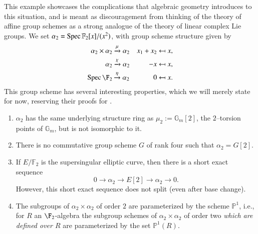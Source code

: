 \begin{example}\label{Alpha2Example}
This example showcases the complications that algebraic geometry introduces to this situation, and is meant as discouragement from thinking of the theory of affine group schemes as a strong analogue of the theory of linear complex Lie groups.  We set $\alpha_2 = \operatorname{Spec} \mathbb{F}_2[x]/(x^2)$, with group scheme structure given by
\begin{align*}
\alpha_2 \times \alpha_2 &\xrightarrow{\mu} \alpha_2 & x_1 + x_2 & \mapsfrom x, \\
\alpha_2 & \xrightarrow{\chi} \alpha_2 & -x & \mapsfrom x, \\
\Spec \F_2 & \xrightarrow{\eta} \alpha_2 & 0 & \mapsfrom x.
\end{align*}
This group scheme has several interesting properties, which we will merely state for now, reserving their proofs for .
\begin{enumerate}
\item $\alpha_2$ has the same underlying structure ring as $\mu_2 := \mathbb{G}_m[2]$, the $2$--torsion points of $\mathbb G_m$, but is not isomorphic to it.
\item There is no commutative group scheme $G$ of rank four such that $\alpha_2 = G[2]$.
\item If $E/\mathbb{F}_2$ is the supersingular elliptic curve, then there is a short exact sequence \[0 \rightarrow \alpha_2 \rightarrow E[2] \rightarrow \alpha_2 \rightarrow 0.\]  However, this short exact sequence does not split (even after base change).
\item The subgroups of $\alpha_2 \times \alpha_2$ of order $2$ are parameterized by the scheme $\mathbb{P}^1$, i.e., for $R$ an $\F_2$-algebra the subgroup schemes of $\alpha_2 \times \alpha_2$ of order two \emph{which are defined over $R$} are parameterized by the set $\mathbb{P}^1(R)$.
\end{enumerate}
\end{example}


